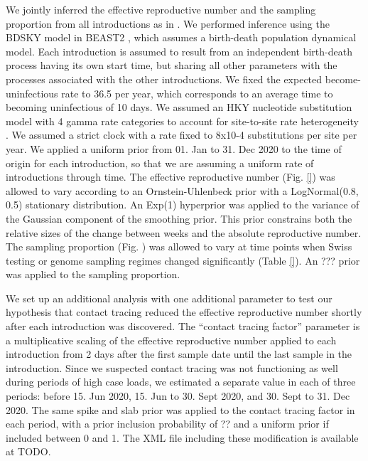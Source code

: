 \documentclass[9pt,twocolumn,twoside,lineno]{pnas-new}
\begin{document}
{We jointly inferred the effective reproductive number and the sampling proportion from all introductions as in \cite{Muller2020}. We performed inference using the BDSKY model \cite{stadler2013birth} in BEAST2 \cite{Bouckaert2019}, which assumes a birth-death population dynamical model. Each introduction is assumed to result from an independent birth-death process having its own start time, but sharing all other parameters with the processes associated with the other introductions. We fixed the expected become-uninfectious rate to 36.5 per year, which corresponds to an average time to becoming uninfectious of 10 days. We assumed an HKY \cite{Hasegawa1985} nucleotide substitution model with 4 gamma rate categories to account for site-to-site rate heterogeneity \cite{Yang1994}. We assumed a strict clock with a rate fixed to 8x10-4 substitutions per site per year. We applied a uniform prior from 01. Jan to 31. Dec 2020 to the time of origin for each introduction, so that we are assuming a uniform rate of introductions through time. The effective reproductive number (Fig. \ref{}) was allowed to vary according to an Ornstein-Uhlenbeck prior with a LogNormal(0.8, 0.5) stationary distribution. An Exp(1) hyperprior was applied to the variance of the Gaussian component of the smoothing prior. This prior constrains both the relative sizes of the change between weeks and the absolute reproductive number. The sampling proportion (Fig. ) was allowed to vary at time points when Swiss testing or genome sampling regimes changed significantly (Table \ref{}). An ??? prior was applied to the sampling proportion.

We set up an additional analysis with one additional parameter to test our hypothesis that contact tracing reduced the effective reproductive number shortly after each introduction was discovered. The ``contact tracing factor'' parameter is a multiplicative scaling of the effective reproductive number applied to each introduction from 2 days after the first sample date until the last sample in the introduction. Since we suspected contact tracing was not functioning as well during periods of high case loads, we estimated a separate value in each of three periods: before 15. Jun 2020, 15. Jun to 30. Sept 2020, and 30. Sept to 31. Dec 2020. The same spike and slab prior was applied to the contact tracing factor in each period, with a prior inclusion probability of ?? and a uniform prior if included between 0 and 1. The XML file including these modification is available at TODO.

}

\showmatmethods{} %


\showacknow{} %


\end{document}
